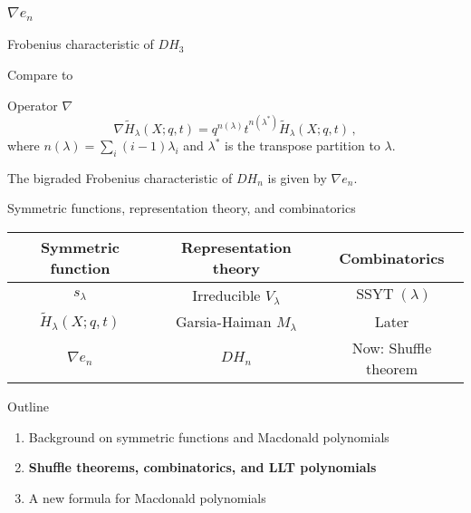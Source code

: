 \documentclass[dvipsnames]{beamer}
\newcommand{\Htild}{\tilde{H}}
\DeclareMathOperator{\SSYT}{SSYT}
\theoremstyle{definition}
\newcounter{c}
\begin{document}
\begin{frame}
  \frametitle{\(\nabla e_n\)}
  Frobenius characteristic of \(DH_3\)\pause
  \begin{center}
    \pause
\end{center}
Compare to  
\begin{center}
  \end{center}\pause
  \begin{block}{Operator \(\nabla\)}
    \[
      \nabla \tilde{H}_\lambda(X;q,t) = q^{n(\lambda)} t^{n(\lambda^*)} \tilde{H}_\lambda(X;q,t)\,,
    \]
    where $n(\lambda) = \sum _{i} (i-1)\lambda_{i}$ and \(\lambda^*\)
    is the transpose partition to \(\lambda\).
  \end{block}\pause
  \begin{theorem}[Haiman, 2002]
    The bigraded Frobenius characteristic of \(DH_n\) is given by \(\nabla e_n\).
  \end{theorem}
\end{frame}
  \begin{frame}{Symmetric functions, representation theory, and combinatorics}
    \begin{tabular}{ccc}
      Symmetric function & Representation theory & Combinatorics 
      \\
      \hline
      \(s_\lambda\) & Irreducible \(V_\lambda\) & \(\SSYT(\lambda)\) \\
      \(\Htild_\lambda(X;q,t)\) & Garsia-Haiman \(M_\lambda\) & Later \\
      \(\nabla e_n\) & \(DH_n\) & Now: Shuffle theorem
    \end{tabular}
  \end{frame}
\begin{frame}{Outline}
  \begin{enumerate}
  \item Background on symmetric functions and Macdonald polynomials
  \item {\bf Shuffle theorems, combinatorics, and LLT polynomials}
  \item A new formula for Macdonald polynomials
  \end{enumerate}
\end{frame}
\end{document}
